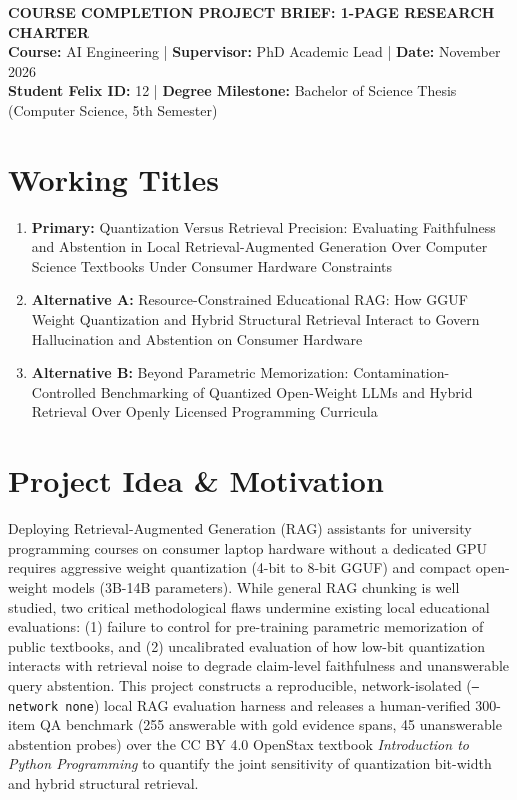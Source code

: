 \documentclass[10pt,a4paper]{article}
\begin{document}
\begin{center}
    {\large \textbf{COURSE COMPLETION PROJECT BRIEF: 1-PAGE RESEARCH CHARTER}}\\[2pt]
    \textbf{Course:} AI Engineering \quad | \quad \textbf{Supervisor:} PhD Academic Lead \quad | \quad \textbf{Date:} November 2026\\[4pt]
    \textbf{Student Felix ID:} 12 \quad | \quad \textbf{Degree Milestone:} Bachelor of Science Thesis (Computer Science, 5th Semester)
\end{center}

\vspace{-4pt}

\section{Working Titles}
\begin{enumerate}
    \item \textbf{Primary:} Quantization Versus Retrieval Precision: Evaluating Faithfulness and Abstention in Local Retrieval-Augmented Generation Over Computer Science Textbooks Under Consumer Hardware Constraints
    \item \textbf{Alternative A:} Resource-Constrained Educational RAG: How GGUF Weight Quantization and Hybrid Structural Retrieval Interact to Govern Hallucination and Abstention on Consumer Hardware
    \item \textbf{Alternative B:} Beyond Parametric Memorization: Contamination-Controlled Benchmarking of Quantized Open-Weight LLMs and Hybrid Retrieval Over Openly Licensed Programming Curricula
\end{enumerate}

\section{Project Idea \& Motivation}
Deploying Retrieval-Augmented Generation (RAG) assistants for university programming courses on consumer laptop hardware without a dedicated GPU requires aggressive weight quantization (4-bit to 8-bit GGUF) and compact open-weight models (3B-14B parameters). While general RAG chunking is well studied, two critical methodological flaws undermine existing local educational evaluations: (1) failure to control for pre-training parametric memorization of public textbooks, and (2) uncalibrated evaluation of how low-bit quantization interacts with retrieval noise to degrade claim-level faithfulness and unanswerable query abstention. This project constructs a reproducible, network-isolated (\texttt{--network none}) local RAG evaluation harness and releases a human-verified 300-item QA benchmark (255 answerable with gold evidence spans, 45 unanswerable abstention probes) over the CC BY 4.0 OpenStax textbook \textit{Introduction to Python Programming} to quantify the joint sensitivity of quantization bit-width and hybrid structural retrieval.
\end{document}
